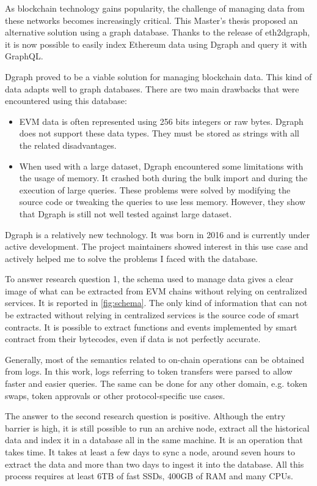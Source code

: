 \label{chapter-7}

As blockchain technology gains popularity, the challenge of managing data from these networks becomes increasingly critical. This Master's thesis proposed an alternative solution using a graph database. Thanks to the release of eth2dgraph, it is now possible to easily index Ethereum data using Dgraph and query it with GraphQL. 

Dgraph proved to be a viable solution for managing blockchain data. This kind of data adapts well to graph databases. There are two main drawbacks that were encountered using this database:

\begin{itemize}
    \item EVM data is often represented using 256 bits integers or raw bytes. Dgraph does not support these data types. They must be stored as strings with all the related disadvantages.
    \item When used with a large dataset, Dgraph encountered some limitations with the usage of memory. It crashed both during the bulk import and during the execution of large queries. These problems were solved by modifying the source code or tweaking the queries to use less memory. However, they show that Dgraph is still not well tested against large dataset.
\end{itemize}

Dgraph is a relatively new technology. It was born in 2016 and is currently under active development. The project maintainers showed interest in this use case and actively helped me to solve the problems I faced with the database.

To answer research question 1, the schema used to manage data gives a clear image of what can be extracted from EVM chains without relying on centralized services. It is reported in \cref{fig:schema}. The only kind of information that can not be extracted without relying in centralized services is the source code of smart contracts. It is possible to extract functions and events implemented by smart contract from their bytecodes, even if data is not perfectly accurate.

Generally, most of the semantics related to on-chain operations can be obtained from logs. In this work, logs referring to token transfers were parsed to allow faster and easier queries. The same can be done for any other domain, e.g. token swaps, token approvals or other protocol-specific use cases.

The answer to the second research question is positive. Although the entry barrier is high, it is still possible to run an archive node, extract all the historical data and index it in a database all in the same machine. It is an operation that takes time. It takes at least a few days to sync a node, around seven hours to extract the data and more than two days to ingest it into the database. All this process requires at least 6TB of fast SSDs, 400GB of RAM and many CPUs. 

